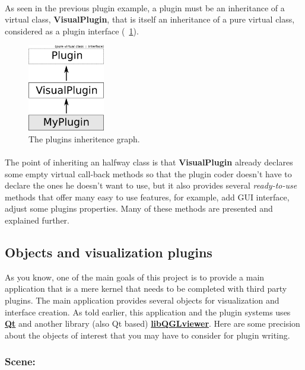 \documentclass[a4paper]{scrreprt}
\begin{document}
	\paragraph{}
	As seen in the previous plugin example, a plugin must be an inheritance of a
	virtual class, \textbf{VisualPlugin}, that is itself an inheritance of a
	pure virtual class, considered as a plugin interface (~\ref{fig:plugins}).
	\begin{figure}[h!p]
		\centering
		\includegraphics[width=0.3\textwidth]{images/plugins}
		\caption{The plugins inheritence graph.}
		\label{fig:plugins}
	\end{figure}
	\paragraph{}
	The point of inheriting an halfway class is that \textbf{VisualPlugin} already
	declares some empty virtual call-back methods so that the plugin coder doesn't
	have to declare the ones he doesn't want to use, but it also provides several
	\textit{ready-to-use} methods that offer many easy to use features, for
	example, add GUI interface, adjust some plugins properties. Many of these methods are
	presented and explained further. 
\subsection{Objects and visualization plugins}
	As you know, one of the main goals of this project is to provide a main
	application that is a mere kernel that needs to be completed with third party
	plugins. The main application provides several objects for visualization and
	interface creation. As told earlier, this application and the plugin systems
	uses \href{http://qt-project.org/}{\textbf{Qt}} and another library
	(also Qt based) \textbf{\href{http://www.libqglviewer.com/}{libQGLviewer}}.
	Here are some precision about the objects of interest that you may have to
	consider for plugin writing.
	
	\subsubsection{Scene:}
\end{document}
